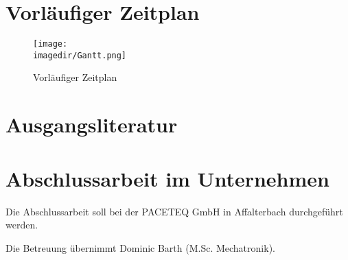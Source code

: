\documentclass[12pt]{article} %
\newcommand{\imagedir}{../../Doc/Images}
\begin{document}
\newpage

\section{Vorläufiger Zeitplan}

\begin{figure}[h!]
  \centering
  \texttt{[image: \\imagedir/Gantt.png]}
  \caption{Vorläufiger Zeitplan}
  \label{fig:gantt}
\end{figure}

\section{Ausgangsliteratur}
\printbibliography[title={""}]

\section{Abschlussarbeit im Unternehmen}

Die Abschlussarbeit soll bei der PACETEQ GmbH in Affalterbach durchgeführt werden.

Die Betreuung übernimmt Dominic Barth (M.Sc. Mechatronik).
\end{document}
